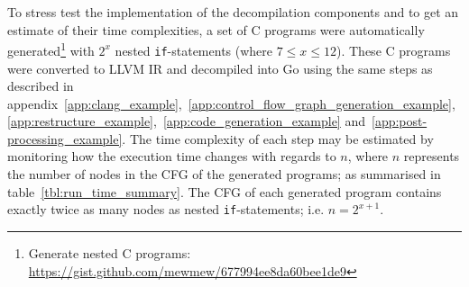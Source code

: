To stress test the implementation of the decompilation components and to get an estimate of their time complexities, a set of C programs were automatically generated\footnote{Generate nested C programs: \url{https://gist.github.com/mewmew/677994ee8da60bee1de9}} with $ 2^{x} $ nested \texttt{if}-statements (where $ 7 \le x \le 12 $). These C programs were converted to LLVM IR and decompiled into Go using the same steps as described in appendix~\ref{app:clang_example},~\ref{app:control_flow_graph_generation_example},~\ref{app:restructure_example},~\ref{app:code_generation_example} and~\ref{app:post-processing_example}. The time complexity of each step may be estimated by monitoring how the execution time changes with regards to $ n $, where $ n $ represents the number of nodes in the CFG of the generated programs; as summarised in table~\ref{tbl:run_time_summary}. The CFG of each generated program contains exactly twice as many nodes as nested \texttt{if}-statements; i.e. $ n = 2^{x+1} $.

